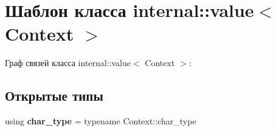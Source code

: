 \hypertarget{classinternal_1_1value}{}\section{Шаблон класса internal\+:\+:value$<$ Context $>$}
\label{classinternal_1_1value}


Граф связей класса internal\+:\+:value$<$ Context $>$\+:
\subsection*{Открытые типы}
\begin{DoxyCompactItemize}
\item 
\mbox{\label{classinternal_1_1value_aed51f15167c9f6c16cd137b9ef241120}} 
using {\bfseries char\+\_\+type} = typename Context\+::char\+\_\+type
\end{DoxyCompactItemize}
